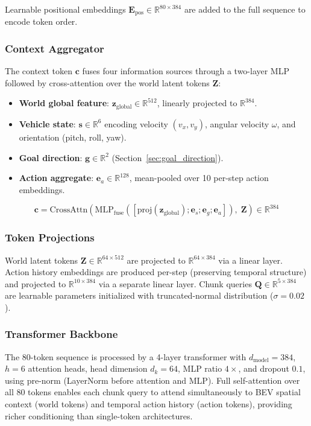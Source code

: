 \documentclass[journal]{IEEEtran}
\begin{document}
Learnable positional embeddings $\mathbf{E}_\text{pos} \in \mathbb{R}^{80 \times 384}$ are added to the full sequence to encode token order.

\subsubsection{Context Aggregator}
The context token $\mathbf{c}$ fuses four information sources through a two-layer MLP followed by cross-attention over the world latent tokens $\mathbf{Z}$:
\begin{itemize}
    \item \textbf{World global feature}: $\mathbf{z}_\text{global} \in \mathbb{R}^{512}$, linearly projected to $\mathbb{R}^{384}$.
    \item \textbf{Vehicle state}: $\mathbf{s} \in \mathbb{R}^{6}$ encoding velocity $(v_x, v_y)$, angular velocity $\omega$, and orientation (pitch, roll, yaw).
    \item \textbf{Goal direction}: $\mathbf{g} \in \mathbb{R}^{2}$ (Section~\ref{sec:goal_direction}).
    \item \textbf{Action aggregate}: $\mathbf{e}_a \in \mathbb{R}^{128}$, mean-pooled over 10 per-step action embeddings.
\end{itemize}
\begin{equation}
    \mathbf{c} = \text{CrossAttn}\!\left(\text{MLP}_\text{fuse}([\text{proj}(\mathbf{z}_\text{global}); \mathbf{e}_s; \mathbf{e}_g; \mathbf{e}_a]),\;\mathbf{Z}\right) \in \mathbb{R}^{384}
\end{equation}

\subsubsection{Token Projections}
World latent tokens $\mathbf{Z} \in \mathbb{R}^{64 \times 512}$ are projected to $\mathbb{R}^{64 \times 384}$ via a linear layer. Action history embeddings are produced per-step (preserving temporal structure) and projected to $\mathbb{R}^{10 \times 384}$ via a separate linear layer. Chunk queries $\mathbf{Q} \in \mathbb{R}^{5 \times 384}$ are learnable parameters initialized with truncated-normal distribution ($\sigma{=}0.02$).

\subsubsection{Transformer Backbone}
The 80-token sequence is processed by a 4-layer transformer with $d_\text{model}{=}384$, $h{=}6$ attention heads, head dimension $d_k{=}64$, MLP ratio $4\times$, and dropout $0.1$, using pre-norm (LayerNorm before attention and MLP). Full self-attention over all 80 tokens enables each chunk query to attend simultaneously to BEV spatial context (world tokens) and temporal action history (action tokens), providing richer conditioning than single-token architectures.
\end{document}
